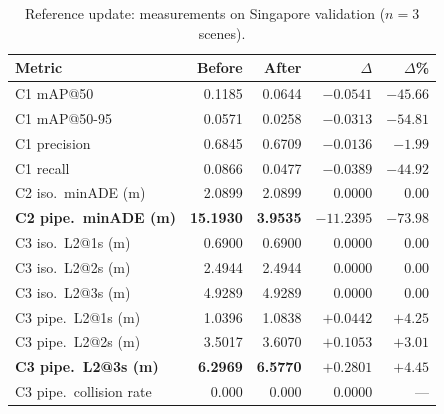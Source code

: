 \documentclass[conference]{IEEEtran}
\begin{document}
\begin{table}[htbp]
\caption{Reference update: measurements on Singapore validation ($n=3$ scenes).}
\label{tab:results}
\centering
\renewcommand{\arraystretch}{1.2}
\setlength{\tabcolsep}{4pt}
\begin{tabular}{@{}lrrrr@{}}
\toprule
\textbf{Metric} & \textbf{Before} & \textbf{After} & \textbf{$\Delta$} & \textbf{$\Delta$\%} \\
\midrule
C1 mAP@50                & 0.1185  & 0.0644 & $-0.0541$  & $-45.66$ \\
C1 mAP@50-95             & 0.0571  & 0.0258 & $-0.0313$  & $-54.81$ \\
C1 precision             & 0.6845  & 0.6709 & $-0.0136$  & $-1.99$  \\
C1 recall                & 0.0866  & 0.0477 & $-0.0389$  & $-44.92$ \\
C2 iso.\ minADE (m)      & 2.0899  & 2.0899 & $0.0000$   & $0.00$   \\
\textbf{C2 pipe.\ minADE (m)} & \textbf{15.1930} & \textbf{3.9535} & $\mathbf{-11.2395}$ & $\mathbf{-73.98}$ \\
C3 iso.\ L2@1s (m)       & 0.6900  & 0.6900 & $0.0000$   & $0.00$   \\
C3 iso.\ L2@2s (m)       & 2.4944  & 2.4944 & $0.0000$   & $0.00$   \\
C3 iso.\ L2@3s (m)       & 4.9289  & 4.9289 & $0.0000$   & $0.00$   \\
C3 pipe.\ L2@1s (m)      & 1.0396  & 1.0838 & $+0.0442$  & $+4.25$  \\
C3 pipe.\ L2@2s (m)      & 3.5017  & 3.6070 & $+0.1053$  & $+3.01$  \\
\textbf{C3 pipe.\ L2@3s (m)} & \textbf{6.2969} & \textbf{6.5770} & $\mathbf{+0.2801}$ & $\mathbf{+4.45}$ \\
C3 pipe.\ collision rate & 0.000   & 0.000  & $0.0000$   & --- \\
\bottomrule
\end{tabular}
\end{table}
\end{document}
